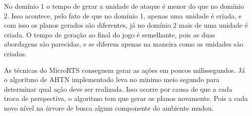 No domínio 1 o tempo de gerar a unidade de ataque é menor do que no domínio 2.
Isso acontece, pelo fato de que no domínio 1, apenas uma unidade é criada, e com isso os planos gerados são diferentes, já no domínio 2 mais de uma unidade é criada.
O tempo de geração ao final do jogo é semelhante, pois as duas abordagens são parecidas, e se diferem apenas na maneira como as unidades são criadas.

As técnicas do MicroRTS conseguem gerar as ações em poucos milissegundos.
Já o algoritmo de AHTN implementado leva no minimo meio segundo para determinar qual ação deve ser realizada.
Isso ocorre por causa de que a cada troca de perspectiva, o algoritmo tem que gerar os planos novamente.
Pois a cada novo nível na árvore de busca algum componente do ambiente mudou.


